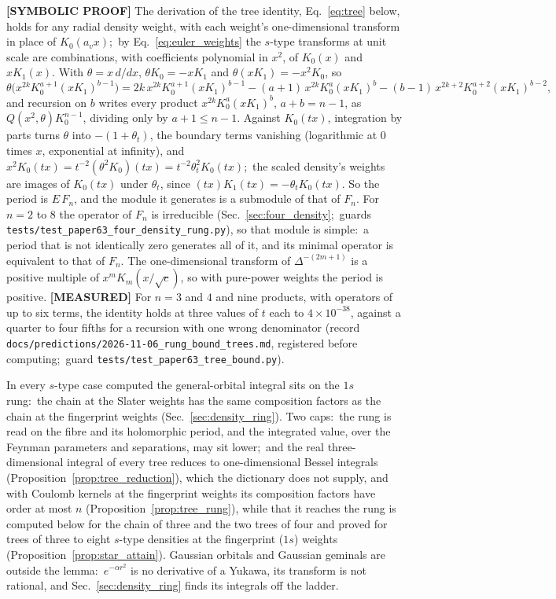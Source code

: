 \documentclass[aps,pra,twocolumn,superscriptaddress,longbibliography]{revtex4-2}
\begin{document}
\textbf{[SYMBOLIC PROOF]} The derivation of the tree identity,
Eq.~\eqref{eq:tree} below, holds for any radial density weight, with each
weight's one-dimensional transform in place of $K_0(a_vx)$;\ by
Eq.~\eqref{eq:euler_weights} the $s$-type transforms at unit scale are
combinations, with coefficients polynomial in $x^2$, of $K_0(x)$ and
$xK_1(x)$.  With $\theta=x\,d/dx$, $\theta K_0=-xK_1$ and
$\theta(xK_1)=-x^2K_0$, so
\begin{equation}
  \theta\bigl(x^{2k}K_0^{a+1}(xK_1)^{b-1}\bigr)
  =2k\,x^{2k}K_0^{a+1}(xK_1)^{b-1}-(a+1)\,x^{2k}K_0^{a}(xK_1)^{b}
  -(b-1)\,x^{2k+2}K_0^{a+2}(xK_1)^{b-2},
  \label{eq:tree_bound_recursion}
\end{equation}
and recursion on $b$ writes every product $x^{2k}K_0^a(xK_1)^b$, $a+b=n-1$,
as $Q(x^2,\theta)K_0^{n-1}$, dividing only by $a+1\le n-1$.  Against
$K_0(tx)$, integration by parts turns $\theta$ into $-(1+\theta_t)$, the
boundary terms vanishing (logarithmic at $0$ times $x$, exponential at
infinity), and $x^2K_0(tx)=t^{-2}(\theta^2K_0)(tx)=t^{-2}\theta_t^2K_0(tx)$;\
the scaled density's weights are images of $K_0(tx)$ under $\theta_t$, since
$(tx)K_1(tx)=-\theta_tK_0(tx)$.  So the period is $E\,F_n$, and the module it
generates is a submodule of that of $F_n$.  For $n=2$ to $8$ the operator of
$F_n$ is irreducible (Sec.~\ref{sec:four_density};\ guards
\texttt{tests/test\_paper63\_four\_density\_rung.py}), so that module is
simple:\
a period that is not identically zero generates all of it, and its minimal
operator is equivalent to that of $F_n$.  The one-dimensional transform of
$\Delta^{-(2m+1)}$ is a positive multiple of $x^mK_m(x/\sqrt c)$, so with
pure-power weights the period is positive.  \textbf{[MEASURED]} For $n=3$ and
$4$ and nine products, with operators of up to six terms, the identity holds
at three values of $t$ each to $4\times10^{-38}$, against a quarter to four
fifths for a recursion with one wrong denominator (record
\texttt{docs/predictions/2026-11-06\_rung\_bound\_trees.md}, registered before
computing;\ guard \texttt{tests/test\_paper63\_tree\_bound.py}).

In every $s$-type case computed
the general-orbital integral sits on the $1s$ rung:\ the chain at the Slater
weights has the same composition factors as the chain at the fingerprint
weights (Sec.~\ref{sec:density_ring}).  Two caps:\ the rung is read on the fibre and its
holomorphic period, and the integrated value, over the Feynman parameters
and separations, may sit lower;\ and the real three-dimensional integral of
every tree reduces to one-dimensional Bessel integrals
(Proposition~\ref{prop:tree_reduction}), which the dictionary does not
supply, and with Coulomb kernels at the fingerprint weights its
composition factors have order at most $n$
(Proposition~\ref{prop:tree_rung}), while that it reaches the rung is computed
below for the chain of three and the two trees of four and proved for trees of three to eight $s$-type densities at the fingerprint ($1s$) weights (Proposition~\ref{prop:star_attain}).  Gaussian orbitals and Gaussian geminals are outside
the lemma:\ $e^{-\alpha r^2}$ is no derivative of a Yukawa, its transform is
not rational, and Sec.~\ref{sec:density_ring} finds its integrals off the
ladder.
\end{document}
